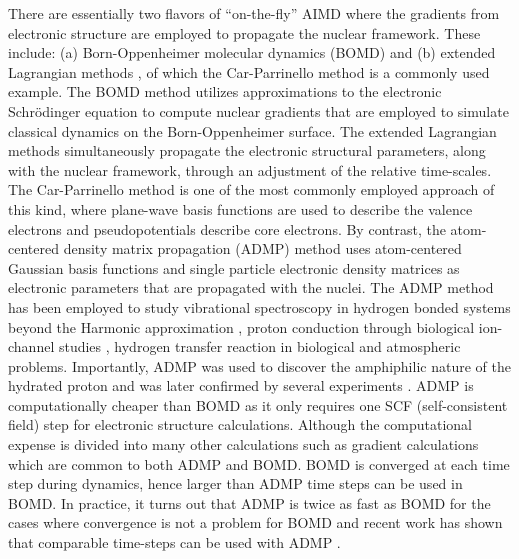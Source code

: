 There are essentially two flavors of ``on-the-fly'' AIMD where the gradients from
electronic structure are employed to propagate the nuclear framework. These include:
(a) Born-Oppenheimer molecular dynamics (BOMD) \cite{KarplusBO1, Leforestier-BO,
Helgaker-AIBO, BO-Hase, bernyPESreview, 
pulay, CPchargedsystems} and (b) extended Lagrangian methods \cite{AndersenEL,
ParrinelloEL}, of which the Car-Parrinello method
\cite{CP, Madden, Marx-Cpreview, Cpdensity, Cptuckerman1, Cptuckerman3, Cpcpks, Carpar89,
Galli91, Parrinello-harmonic, Na+solv, NH4+solv, K+solv, SO3solv, Be2+solv, H+OH-solv,
Parrinello:ClH2O6, CarPar-Laasonen, CP-Wannier1, Marzari-Vanderbilt-Wannier, Kohn-Wannier,
CP-Gaussians1, CP-Gaussians2, CP-Gaussians-Martyna, Galli-mu-problem-BOCP, Galli-mu-problem,
carter1, carter2, carter3} is a commonly used example. The BOMD
method utilizes approximations to the electronic Schr\"{o}dinger equation to
compute nuclear gradients that are employed to simulate classical dynamics on the
Born-Oppenheimer surface. The extended Lagrangian methods simultaneously propagate the
electronic structural parameters, along with the nuclear framework, through an adjustment
of the relative time-scales. The Car-Parrinello method is one of the most commonly employed approach
of this kind, where plane-wave basis functions are used to describe the valence
electrons and pseudopotentials describe core electrons. By contrast, the atom-centered
density matrix propagation (ADMP) \cite{admp1,admp2,admp3,admp4,IyengarFrisch,
IyengarSchlegelVoth} method uses atom-centered Gaussian basis functions and single
particle electronic density matrices as electronic parameters that are propagated
with the nuclei. The ADMP method has been employed to study vibrational spectroscopy
in hydrogen bonded systems beyond the Harmonic approximation
\cite{IyengarPetersen,IyengarProtonatedWater2,DietrickIyengar,LiTeigeIyengar,
LiOomensEyler,IyengarLiSumner}, proton conduction through biological ion-channel
studies \cite{RegaIyengar}, hydrogen transfer reaction in biological
\cite{SLO1-Rareevents} and atmospheric \cite{VimalPacheco,PachecoDietrick,
DietrickPachecoPhatak} problems. Importantly, ADMP was used to discover the
amphiphilic nature of the hydrated proton \cite{PetersenIyengar,IyengarDayVoth}
and was later confirmed by several experiments \cite{PetersenIyengar,IyengarDayVoth,
PetersenSaykally1,PetersenSaykally2,LeveringSierra,MuchaFrigato,KudinCar}. ADMP is
computationally cheaper than BOMD as it only requires one SCF (self-consistent field)
step for electronic structure calculations. Although the computational expense is divided
into many other
calculations such as gradient calculations which are common to both ADMP and BOMD. BOMD
is converged at each time step during dynamics, hence larger than ADMP time steps can
be used in BOMD. In practice, it turns out that ADMP is twice as fast as BOMD for the
cases where convergence is not a problem for BOMD \cite{BrorsenZahariev} and recent work
has shown that comparable time-steps can be used with ADMP \cite{TimsPaper}.

